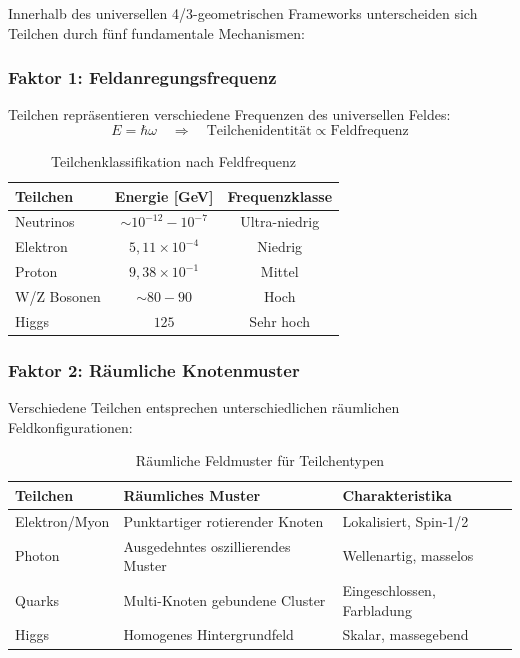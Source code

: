 	Innerhalb des universellen 4/3-geometrischen Frameworks unterscheiden sich Teilchen durch fünf fundamentale Mechanismen:
	
	\subsubsection{Faktor 1: Feldanregungsfrequenz}
	\label{subsubsec:anregungsfrequenz}
	
	Teilchen repräsentieren verschiedene Frequenzen des universellen Feldes:
	\begin{equation}
		E = \hbar \omega \quad \Rightarrow \quad \text{Teilchenidentität} \propto \text{Feldfrequenz}
		\label{eq:frequenz_identitaet}
	\end{equation}
	
	\begin{table}[htbp]
		\centering
		\begin{tabular}{lcc}
			\toprule
			\textbf{Teilchen} & \textbf{Energie [GeV]} & \textbf{Frequenzklasse} \\
			\midrule
			Neutrinos & $\sim 10^{-12} - 10^{-7}$ & Ultra-niedrig \\
			Elektron & $5{,}11 \times 10^{-4}$ & Niedrig \\
			Proton & $9{,}38 \times 10^{-1}$ & Mittel \\
			W/Z Bosonen & $\sim 80-90$ & Hoch \\
			Higgs & $125$ & Sehr hoch \\
			\bottomrule
		\end{tabular}
		\caption{Teilchenklassifikation nach Feldfrequenz}
		\label{tab:frequenz_klassifikation}
	\end{table}
	
	\subsubsection{Faktor 2: Räumliche Knotenmuster}
	\label{subsubsec:raeumliche_muster}
	
	Verschiedene Teilchen entsprechen unterschiedlichen räumlichen Feldkonfigurationen:
	
	\begin{table}[htbp]
		\centering
		\begin{tabular}{lp{5cm}p{4cm}}
			\toprule
			\textbf{Teilchen} & \textbf{Räumliches Muster} & \textbf{Charakteristika} \\
			\midrule
			Elektron/Myon & Punktartiger rotierender Knoten & Lokalisiert, Spin-1/2 \\
			Photon & Ausgedehntes oszillierendes Muster & Wellenartig, masselos \\
			Quarks & Multi-Knoten gebundene Cluster & Eingeschlossen, Farbladung \\
			Higgs & Homogenes Hintergrundfeld & Skalar, massegebend \\
			\bottomrule
		\end{tabular}
		\caption{Räumliche Feldmuster für Teilchentypen}
		\label{tab:raeumliche_feldmuster}
	\end{table}
	
